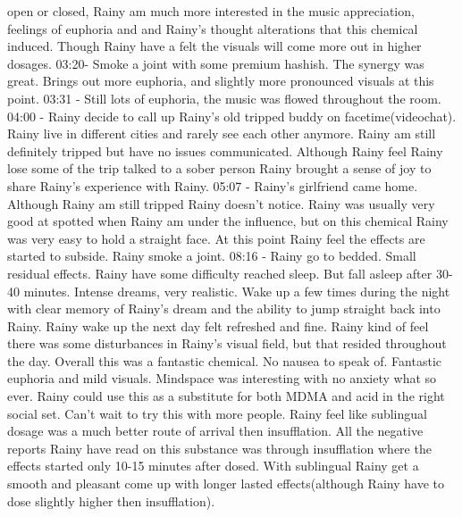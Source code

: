 \documentclass[12pt]{book}
\begin{document}
open or closed, Rainy am much more interested in the music appreciation, feelings of euphoria and and Rainy's thought alterations that this chemical induced. Though Rainy have a felt the visuals will come more out in higher dosages. 03:20- Smoke a joint with some premium hashish. The synergy was great. Brings out more euphoria, and slightly more pronounced visuals at this point. 03:31 - Still lots of euphoria, the music was flowed throughout the room. 04:00 - Rainy decide to call up Rainy's old tripped buddy on facetime(videochat). Rainy live in different cities and rarely see each other anymore. Rainy am still definitely tripped but have no issues communicated. Although Rainy feel Rainy lose some of the trip talked to a sober person Rainy brought a sense of joy to share Rainy's experience with Rainy. 05:07 - Rainy's girlfriend came home. Although Rainy am still tripped Rainy doesn't notice. Rainy was usually very good at spotted when Rainy am under the influence, but on this chemical Rainy was very easy to hold a straight face. At this point Rainy feel the effects are started to subside. Rainy smoke a joint. 08:16 - Rainy go to bedded. Small residual effects. Rainy have some difficulty reached sleep. But fall asleep after 30-40 minutes. Intense dreams, very realistic. Wake up a few times during the night with clear memory of Rainy's dream and the ability to jump straight back into Rainy. Rainy wake up the next day felt refreshed and fine. Rainy kind of feel there was some disturbances in Rainy's visual field, but that resided throughout the day. Overall this was a fantastic chemical. No nausea to speak of. Fantastic euphoria and mild visuals. Mindspace was interesting with no anxiety what so ever. Rainy could use this as a substitute for both MDMA and acid in the right social set. Can't wait to try this with more people. Rainy feel like sublingual dosage was a much better route of arrival then insufflation. All the negative reports Rainy have read on this substance was through insufflation where the effects started only 10-15 minutes after dosed. With sublingual Rainy get a smooth and pleasant come up with longer lasted effects(although Rainy have to dose slightly higher then insufflation).
\end{document}
